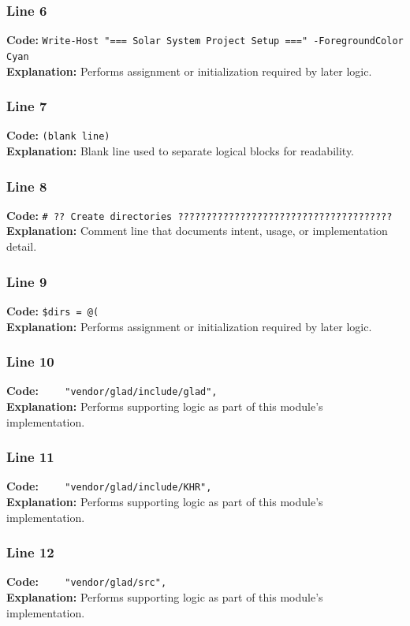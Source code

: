 \documentclass[11pt,a4paper]{article}
\begin{document}
\subsubsection*{Line 6}
\textbf{Code:} \verb|Write-Host "=== Solar System Project Setup ===" -ForegroundColor Cyan|\\
\textbf{Explanation:} Performs assignment or initialization required by later logic.

\subsubsection*{Line 7}
\textbf{Code:} \texttt{(blank line)}\\
\textbf{Explanation:} Blank line used to separate logical blocks for readability.

\subsubsection*{Line 8}
\textbf{Code:} \verb|# ?? Create directories ??????????????????????????????????????|\\
\textbf{Explanation:} Comment line that documents intent, usage, or implementation detail.

\subsubsection*{Line 9}
\textbf{Code:} \verb|$dirs = @(|\\
\textbf{Explanation:} Performs assignment or initialization required by later logic.

\subsubsection*{Line 10}
\textbf{Code:} \verb|    "vendor/glad/include/glad",|\\
\textbf{Explanation:} Performs supporting logic as part of this module's implementation.

\subsubsection*{Line 11}
\textbf{Code:} \verb|    "vendor/glad/include/KHR",|\\
\textbf{Explanation:} Performs supporting logic as part of this module's implementation.

\subsubsection*{Line 12}
\textbf{Code:} \verb|    "vendor/glad/src",|\\
\textbf{Explanation:} Performs supporting logic as part of this module's implementation.
\end{document}
